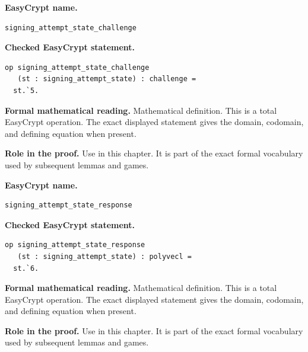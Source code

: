 \begin{formaldefinition}
\noindent\textbf{EasyCrypt name.}
\begin{lstlisting}[language=EasyCrypt,basicstyle=\ttfamily\scriptsize]
signing_attempt_state_challenge
\end{lstlisting}
\noindent\textbf{Checked EasyCrypt statement.}
\begin{lstlisting}[language=EasyCrypt,basicstyle=\ttfamily\scriptsize]
op signing_attempt_state_challenge
   (st : signing_attempt_state) : challenge =
  st.`5.
\end{lstlisting}
\noindent\textbf{Formal mathematical reading.}
Mathematical definition. This is a total EasyCrypt operation.  The exact displayed statement gives the domain, codomain, and defining equation when present.

\noindent\textbf{Role in the proof.}
Use in this chapter. It is part of the exact formal vocabulary used by subsequent lemmas and games.

\end{formaldefinition}

\begin{formaldefinition}
\noindent\textbf{EasyCrypt name.}
\begin{lstlisting}[language=EasyCrypt,basicstyle=\ttfamily\scriptsize]
signing_attempt_state_response
\end{lstlisting}
\noindent\textbf{Checked EasyCrypt statement.}
\begin{lstlisting}[language=EasyCrypt,basicstyle=\ttfamily\scriptsize]
op signing_attempt_state_response
   (st : signing_attempt_state) : polyvecl =
  st.`6.
\end{lstlisting}
\noindent\textbf{Formal mathematical reading.}
Mathematical definition. This is a total EasyCrypt operation.  The exact displayed statement gives the domain, codomain, and defining equation when present.

\noindent\textbf{Role in the proof.}
Use in this chapter. It is part of the exact formal vocabulary used by subsequent lemmas and games.

\end{formaldefinition}

